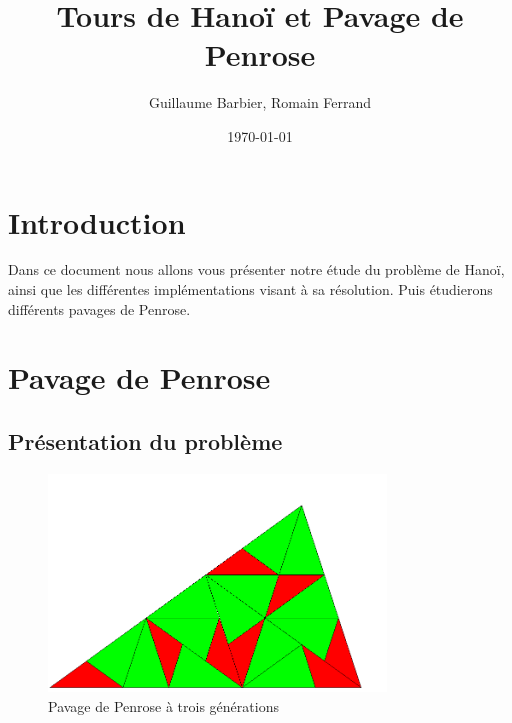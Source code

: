 \documentclass[a4paper,11pt]{article}
\begin{document}
\begin{titlepage}
  \title{Tours de Hanoï et Pavage de Penrose}
  \author{Guillaume Barbier, Romain Ferrand}
  \date{\today}

  \maketitle

  \begin{abstract}
    
  \end{abstract}
\end{titlepage}

\section*{Introduction}
\begin{center}
	Dans ce document nous allons vous présenter notre étude du problème de Hanoï,
    ainsi que les différentes implémentations visant à sa résolution.
    Puis étudierons différents pavages de Penrose.
\end{center}

\section{Pavage de Penrose}
\label{chap:penrose}



\subsection{Présentation du problème}
\label{sec:prezPenrose}
\begin{figure}
  \centering
  \includegraphics[width=0.8\textwidth]{penrose_example.png}
  \caption{Pavage de Penrose à trois générations}
  \label{fig:penrose_example}
\end{figure}
\end{document}
